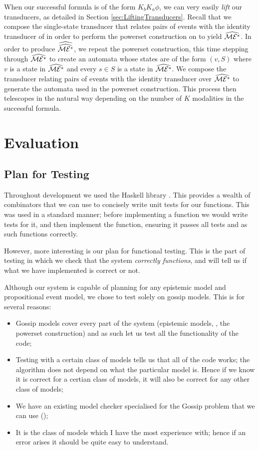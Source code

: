 \documentclass[10pt, a4paper]{report}
\begin{document}
When our successful formula is of the form $K_b K_a \phi$, we can very easily
\emph{lift} our transducers, as detailed in Section
\ref{sec:LiftingTransducers}. Recall that we compose the single-state transducer
that relates pairs of events with the identity transducer of \mestar in order to
perform the powerset construction on \mestar to yield $\widehat{\mathcal{ME^\ast}}$. In
order to produce $\widehat{\widehat{\mathcal{ME^\ast}}}$, we repeat the powerset construction,
this time stepping through $\widehat{\mathcal{ME^\ast}}$ to create an automata whose
states are of the form $(v, S)$ where $v$ is a state in $\widehat{\mathcal{ME^\ast}}$ and
every $s \in S$ is a state in $\widehat{\mathcal{ME^\ast}}$. We compose the transducer
relating pairs of events with the identity transducer over $\widehat{\mathcal{ME^\ast}}$
to generate the automata used in the powerset construction. This process then
telescopes in the natural way depending on the number of $K$ modalities in the
successful formula.

\newpage

\chapter{Evaluation}

\section{Plan for Testing}

Throughout development we used the Haskell library . This provides
a wealth of combinators that we can use to concisely write unit tests for our
functions. This was used in a standard manner; before implementing a function we
would write tests for it, and then implement the function, ensuring it passes
all tests and as such functions correctly.

However, more interesting is our plan for functional testing. This is the part
of testing in which we check that the system \emph{correctly functions}, and
will tell us if what we have implemented is correct or not.

Although our system is capable of planning for any epistemic model and
propositional event model, we chose to test solely on gossip models. This is
for several reasons:

\begin{itemize}
\item Gossip models cover every part of the system (epistemic models, \mestar,
  the powerset construction) and as such let us test all the functionality of
  the code;
\item Testing with a certain class of models tells us that all of the code
  works; the algorithm does not depend on what the particular model is. Hence if
  we know it is correct for a certian class of models, it will also be correct
  for any other class of models;
\item We have an existing model checker specialised for the Gossip problem that we can use
  (\cite{GithubGossip});
\item It is the class of models which I have the most experience with; hence if
  an error arises it should be quite easy to understand.
\end{itemize}
\end{document}
